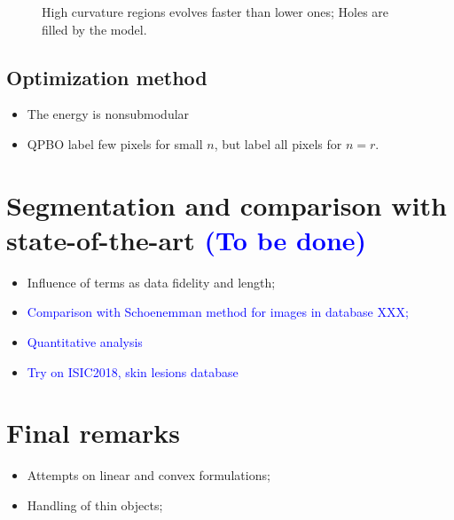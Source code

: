 \documentclass[runningheads]{llncs}
\newcommand{\todo}[1]{{\textcolor{blue}{#1}}}
\begin{document}
\begin{figure}[!ht]
\label{fig:mx-speed-variation-hole-filling}
\caption{High curvature regions evolves faster than lower ones; Holes are filled by the model. }
\end{figure}


\subsection{Optimization method}

\begin{itemize}
	\item{The energy is nonsubmodular}
	\item{QPBO label few pixels for small $n$, but label all pixels for $n=r$.}	
\end{itemize}


\section{Segmentation and comparison with state-of-the-art \todo{(To be done)}}

\begin{itemize}
    \item{Influence of terms as data fidelity and length; }
	\item{\todo{Comparison with Schoenemman method for images in database XXX; }}
	\item{\todo{Quantitative analysis}}
	\item{\todo{Try on ISIC2018, skin lesions database}}
\end{itemize}


\section{Final remarks}

\begin{itemize}
    \item{Attempts on linear and convex formulations; }
    \item{Handling of thin objects;  }
\end{itemize}

%
%
%


\end{document}
